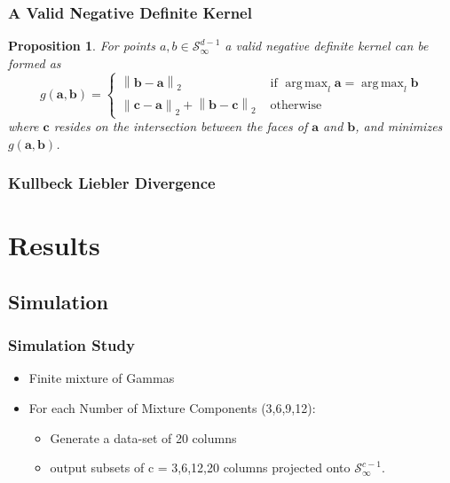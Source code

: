 \documentclass[aspectratio=169]{beamer}
\newcommand{\norm}[1]{\left\lVert #1 \right\rVert}
\newcommand{\pnorm}[2]{\norm{#1}_{#2}}
\newtheorem{prop}{Proposition}
\DeclareMathOperator*{\argmax}{arg\,max}
\begin{document}
\begin{frame}
  \frametitle{A Valid Negative Definite Kernel}
  \begin{prop}
    For points $a,b \in \mathcal{S}_{\infty}^{d-1}$ a valid negative definite kernel can be formed as
    \begin{equation*}
      g(\bm{a},\bm{b}) = \begin{cases}
        \pnorm{\bm{b}-\bm{a}}{2} &\text{ if }\argmax_l\bm{a} = \argmax_l\bm{b}\\
        \pnorm{\bm{c}-\bm{a}}{2} + \pnorm{\bm{b}-\bm{c}}{2} &\text{ otherwise}
      \end{cases}
    \end{equation*}
    where $\bm{c}$ resides on the intersection between the faces of $\bm{a}$ and $\bm{b}$, and
                minimizes $g(\bm{a},\bm{b})$.
  \end{prop}
\end{frame}

\begin{frame}
  \frametitle{Kullbeck Liebler Divergence}
\end{frame}


\section{Results}

\subsection{Simulation}

\begin{frame}
  \frametitle{Simulation Study}
  \begin{itemize}
    \item Finite mixture of Gammas
    \item For each Number of Mixture Components (3,6,9,12):
      \begin{itemize}
        \item Generate a data-set of 20 columns
        \item output subsets of c = 3,6,12,20 columns projected onto $\mathcal{S}_{\infty}^{c-1}$.
      \end{itemize}
  \end{itemize}
\end{frame}
\end{document}
